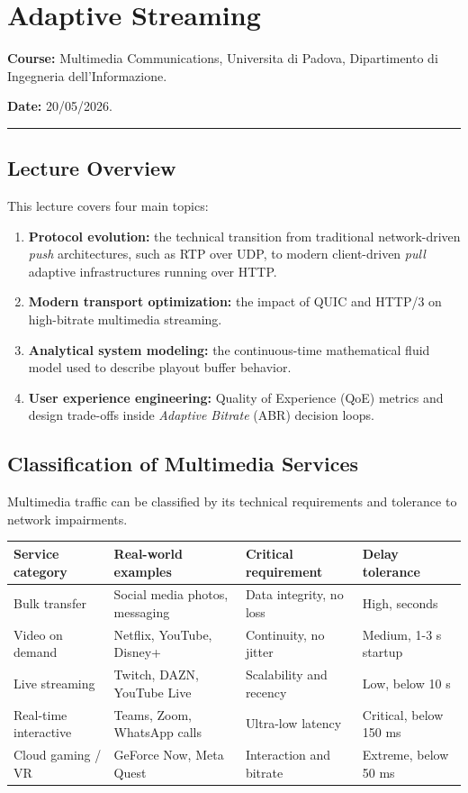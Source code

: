 \chapter{Adaptive Streaming}

\textbf{Course:} Multimedia Communications, Universita di Padova, Dipartimento di Ingegneria dell'Informazione.

\textbf{Date:} 20/05/2026.

\bigskip\hrule\bigskip

\section{Lecture Overview}

This lecture covers four main topics:

\begin{enumerate}
\item \textbf{Protocol evolution:} the technical transition from traditional network-driven \textit{push} architectures, such as RTP over UDP, to modern client-driven \textit{pull} adaptive infrastructures running over HTTP.
\item \textbf{Modern transport optimization:} the impact of QUIC and HTTP/3 on high-bitrate multimedia streaming.
\item \textbf{Analytical system modeling:} the continuous-time mathematical fluid model used to describe playout buffer behavior.
\item \textbf{User experience engineering:} Quality of Experience (QoE) metrics and design trade-offs inside \textit{Adaptive Bitrate} (ABR) decision loops.
\end{enumerate}

\section{Classification of Multimedia Services}

Multimedia traffic can be classified by its technical requirements and tolerance to network impairments.

\begin{center}
\begin{tabular}{|l|l|l|l|}
\hline
\textbf{Service category} & \textbf{Real-world examples} & \textbf{Critical requirement} & \textbf{Delay tolerance} \\ \hline
Bulk transfer & Social media photos, messaging & Data integrity, no loss & High, seconds \\ \hline
Video on demand & Netflix, YouTube, Disney+ & Continuity, no jitter & Medium, 1-3 s startup \\ \hline
Live streaming & Twitch, DAZN, YouTube Live & Scalability and recency & Low, below 10 s \\ \hline
Real-time interactive & Teams, Zoom, WhatsApp calls & Ultra-low latency & Critical, below 150 ms \\ \hline
Cloud gaming / VR & GeForce Now, Meta Quest & Interaction and bitrate & Extreme, below 50 ms \\ \hline
\end{tabular}
\end{center}

